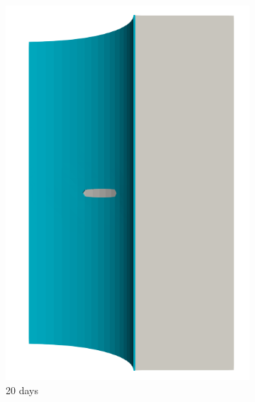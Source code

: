 \begin{figure}[!htb]
  \begin{subfigure}[b]{0.2\textwidth}
    \centering
    \includegraphics[width=\textwidth]{Chapter5/figures/spallation/seed_c_1}
    \caption{20 days}
  \end{subfigure}
  \begin{subfigure}[b]{0.2\textwidth}
    \centering

\end{subfigure}
\end{figure}
